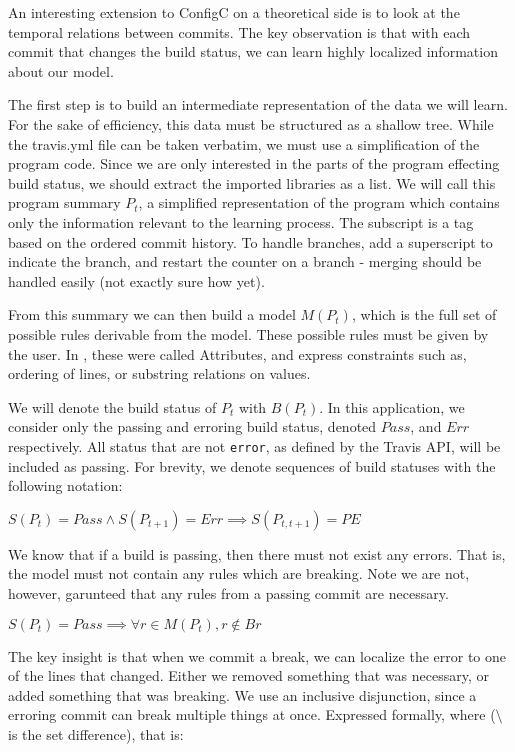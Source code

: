 \documentclass{sigplanconf}
\begin{document}
An interesting extension to ConfigC on a theoretical side is to look at the temporal relations between commits.
The key observation is that with each commit that changes the build status, we can learn highly localized information about our model.

The first step is to build an intermediate representation of the data we will learn.
For the sake of efficiency, this data must be structured as a shallow tree.
While the travis.yml file can be taken verbatim, we must use a simplification of the program code.
Since we are only interested in the parts of the program effecting build status, we should extract the imported libraries as a list.
We will call this program summary $P_t$, a simplified representation of the program which contains only the information relevant to the learning process.
The subscript is a tag based on the ordered commit history.
To handle branches, add a superscript to indicate the branch, and restart the counter on a branch - merging should be handled easily (not exactly sure how yet).

From this summary we can then build a model $M(P_t)$, which is the full set of possible rules derivable from the model.
These possible rules must be given by the user.
In \cite{CAV}, these were called Attributes, and express constraints such as, ordering of lines, or substring relations on values.

We will denote the build status of $P_t$ with $B(P_t)$.
In this application, we consider only the passing and erroring build status, denoted $Pass$, and $Err$ respectively.
All status that are not \verb|error|, as defined by the Travis API, will be included as passing.
For brevity, we denote sequences of build statuses with the following notation:

$S(P_t)=Pass \land S(P_{t+1})=Err \implies S(P_{t,t+1}) = PE$

We know that if a build is passing, then there must not exist any errors.
That is, the model must not contain any rules which are breaking.
Note we are not, however, garunteed that any rules from a passing commit are necessary.

$S(P_t)=Pass \implies \forall r \in M(P_t), r \notin Br$

The key insight is that when we commit a break, we can localize the error to one of the lines that changed.
Either we removed something that was necessary, or added something that was breaking.
We use an inclusive disjunction, since a erroring commit can break multiple things at once.
Expressed formally, where ($\setminus$ is the set difference), that is:
\end{document}
